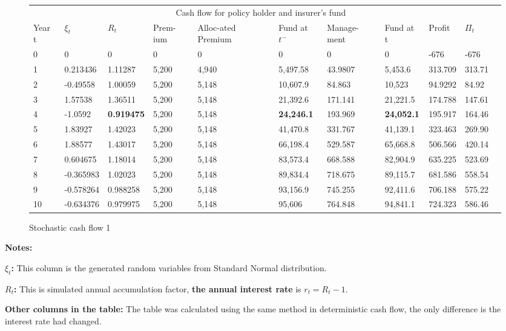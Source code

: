 \documentclass{report}
\begin{document}
\begin{figure}[H]
\begin{tabular}{p{0.5cm} p{1.5cm} p{1.3cm} p{1cm} p{1.5cm} p{1.2cm} p{1.3cm} p{1.3cm}p{1.3cm}p{1.3cm}p{1.3cm} }
\toprule
\multicolumn{10}{c}{Cash flow for policy holder and insurer's fund} \\
\cmidrule(r){3-8}

Year t & $\xi_t$ &$R_t$ & Prem-ium & Alloc-ated Premium & Fund at $t^-$ &Manage-ment & Fund at t& Profit& $\Pi_t$ \\
\midrule
0&0&0&0&0&0&0&0&-676&-676\\
1&0.213436&1.11287&5,200&4,940&5,497.58&43.9807&5,453.6&313.709&313.71\\
2&-0.49558&1.00059&5,200&5,148&10,607.9&84.863&10,523&94.9292&84.92\\
3&1.57538&1.36511&5,200&5,148&21,392.6&171.141&21,221.5&174.788&147.61\\
4&-1.0592&\textbf{0.919475}&5,200&5,148&\textbf{24,246.1}&193.969&\textbf{24,052.1}&195.917&164.46\\
5&1.83927&1.42023&5,200&5,148&41,470.8&331.767&41,139.1&323.463&269.90\\
6&1.88577&1.43017&5,200&5,148&66,198.4&529.587&65,668.8&506.566&420.14\\
7&0.604675&1.18014&5,200&5,148&83,573.4&668.588&82,904.9&635.225&523.69\\
8&-0.365983&1.02023&5,200&5,148&89,834.4&718.675&89,115.7&681.586&558.54\\
9&-0.578264&0.988258&5,200&5,148&93,156.9&745.255&92,411.6&706.188&575.22\\
10&-0.634376&0.979975&5,200&5,148&95,606&764.848&94,841.1&724.323&586.46\\

\bottomrule
\end{tabular}
\caption{Stochastic cash flow 1}
\label{stoch-cashflow}
\end{figure}

\textbf{Notes:}

\textbf{$\xi_t$:} This column is the generated random variables from Standard Normal distribution.

\textbf{$R_t$:} This is simulated annual accumulation factor, \textbf{the annual interest rate} is $r_t = R_t -1$.

\textbf{Other columns in the table:} The table was calculated using the same method in deterministic cash flow, the only difference is the interest rate had changed.
\end{document}
